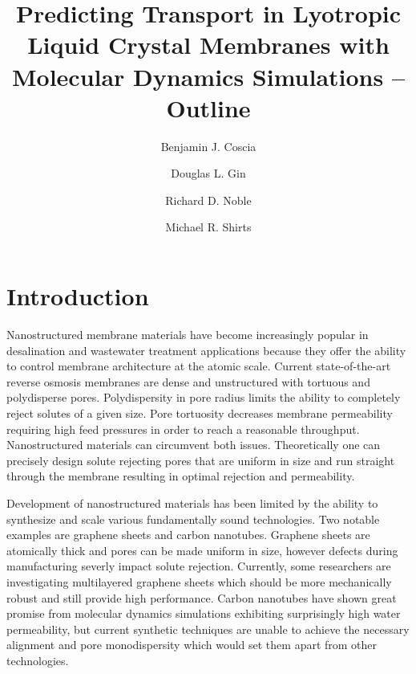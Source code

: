 \documentclass{article}
\title{Predicting Transport in Lyotropic Liquid Crystal Membranes with Molecular Dynamics Simulations -- Outline}
\author{Benjamin J. Coscia \and Douglas L. Gin \and Richard D. Noble \and Michael R. Shirts}
\begin{document}
	
	\maketitle
	\section{Introduction}
	Nanostructured membrane materials have become increasingly popular in desalination and wastewater treatment applications because they offer the ability to control membrane architecture at the atomic scale. Current state-of-the-art reverse osmosis membranes are dense and unstructured with tortuous and polydisperse pores. Polydispersity in pore radius limits the ability to completely reject solutes of a given size. Pore tortuosity decreases membrane permeability requiring high feed pressures in order to reach a reasonable throughput. Nanostructured materials can circumvent both issues. Theoretically one can precisely design solute rejecting pores that are uniform in size and run straight through the membrane resulting in optimal rejection and permeability.   

	Development of nanostructured materials has been limited by the ability to synthesize and scale various fundamentally sound technologies. Two notable examples are graphene sheets and carbon nanotubes. Graphene sheets are atomically thick and pores can be made uniform in size, however defects during manufacturing severly impact solute rejection. Currently, some researchers are investigating multilayered graphene sheets which should be more mechanically robust and still provide high performance. Carbon nanotubes have shown great promise from molecular dynamics simulations exhibiting surprisingly high water permeability, but current synthetic techniques are unable to achieve the necessary alignment and pore monodispersity which would set them apart from other technologies.    
	
\end{document}
